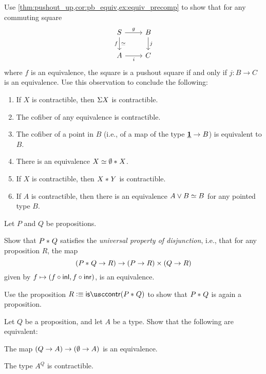 \begin{exercises}
\item \label{ex:pushout_equiv}Use \cref{thm:pushout_up,cor:pb_equiv,ex:equiv_precomp} to show that for any commuting square
\begin{equation*}
\begin{tikzcd}
S \arrow[r,"g"] \arrow[d,swap,"f","{\eqvsym}"'] & B \arrow[d,"j"] \\
A \arrow[r,swap,"i"] & C
\end{tikzcd}
\end{equation*} 
where $f$ is an equivalence, the square is a pushout square if and only if $j:B\to C$ is an equivalence.
Use this observation to conclude the following:
\begin{enumerate}
\item If $X$ is contractible, then $\Sigma X$ is contractible.
\item The cofiber of any equivalence is contractible.
\item The cofiber of a point in $B$ (i.e., of a map of the type $\underline{\mathbf{1}}\to B$) is equivalent to $B$.
\item There is an equivalence $\eqv{X}{\join{\emptyt}{X}}$.
\item If $X$ is contractible, then ${X}\ast_{}{Y}$ is contractible. 
\item If $A$ is contractible, then there is an equivalence $\eqv{A\vee B}{B}$ for any pointed type $B$.
\end{enumerate}
\item \label{ex:join_propositions}Let $P$ and $Q$ be propositions.
\begin{subexenum}
\item Show that ${P}\ast_{}{Q}$ satisfies the \emph{universal property of disjunction}, i.e., that for any proposition $R$, the map
\begin{equation*}
({P}\ast_{}{Q}\to R)\to (P\to R)\times (Q\to R)
\end{equation*}
given by $f\mapsto (f\circ {\mathsf{inl}},f\circ {\mathsf{inr}})$, is an equivalence.
\item Use the proposition $R\defeq\iscontr(\join{P}{Q})$ to show that ${P}\ast_{}{Q}$ is again a proposition.
\end{subexenum}
\item Let $Q$ be a proposition, and let $A$ be a type. Show that the following are equivalent:
\begin{subexenum}
\item The map $(Q\to A)\to(\emptyset\to A)$ is an equivalence.
\item The type $A^Q$ is contractible.

\end{subexenum}
\end{exercises}
